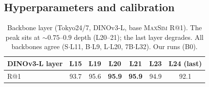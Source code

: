 \subsection{Hyperparameters and calibration}
\label{app:hyper}
\label{sec:exp-hp}
\label{app:abl}
\begin{table}[t]
\caption{Backbone layer (Tokyo24/7, DINOv3-L, base \textsc{MaxSim} R@1). The peak sits at ${\sim}0.75$--$0.9$ depth (L20--21); the last layer degrades. All backbones agree (S$\cdot$L11, B$\cdot$L9, L$\cdot$L20, 7B$\cdot$L32). Our runs (B0).}
\label{tab:layer}
\begin{center}
{\footnotesize\setlength{\tabcolsep}{2pt}%
\begin{tabular}{lcccccc}
\toprule
DINOv3-L layer  & L15 & L19 & L20 & L21 & L23 & L24 (last)\\
\midrule
R@1  & 93.7 & 95.6 & \textbf{95.9} & \textbf{95.9} & 94.9 & 92.1\\
\bottomrule
\end{tabular}%
}
\end{center}
\end{table}
